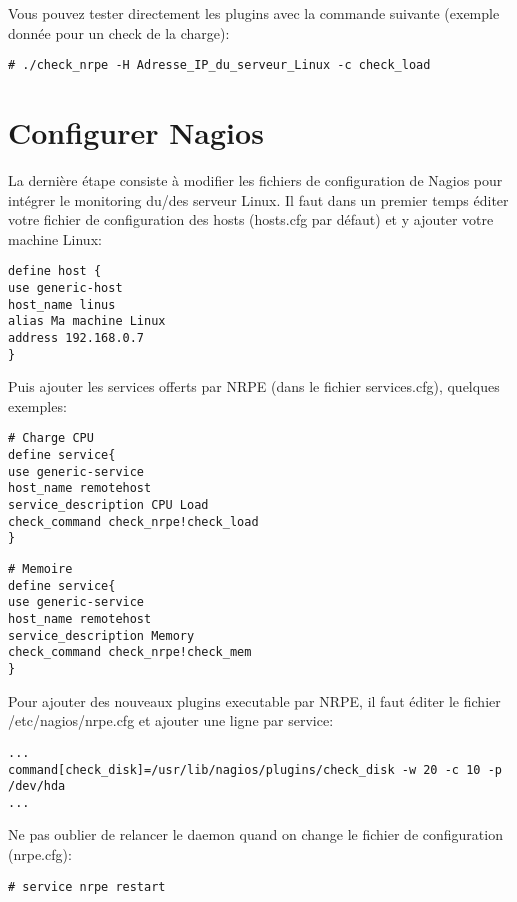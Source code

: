 Vous pouvez tester directement les plugins avec la commande suivante (exemple donnée pour un check de la charge):
\begin{verbatim}
# ./check_nrpe -H Adresse_IP_du_serveur_Linux -c check_load
\end{verbatim}

\section {Configurer Nagios}
La dernière étape consiste à modifier les fichiers de configuration de Nagios pour intégrer le monitoring du/des serveur Linux. Il faut dans un premier temps éditer votre fichier de configuration des hosts (hosts.cfg par défaut) et y ajouter votre machine Linux:
\begin{verbatim}
define host {
use generic-host
host_name linus
alias Ma machine Linux
address 192.168.0.7
}
\end{verbatim}

Puis ajouter les services offerts par NRPE (dans le fichier services.cfg), quelques exemples:
\begin{verbatim}
# Charge CPU
define service{
use generic-service
host_name remotehost
service_description CPU Load
check_command check_nrpe!check_load
}
\end{verbatim}
\begin{verbatim}
# Memoire
define service{
use generic-service
host_name remotehost
service_description Memory
check_command check_nrpe!check_mem
}
\end{verbatim}

Pour ajouter des nouveaux plugins executable par NRPE, il faut éditer le fichier /etc/nagios/nrpe.cfg et ajouter une ligne par service:
\begin{verbatim}
...
command[check_disk]=/usr/lib/nagios/plugins/check_disk -w 20 -c 10 -p /dev/hda
...
\end{verbatim}

Ne pas oublier de relancer le daemon quand on change le fichier de configuration (nrpe.cfg):
\begin{verbatim}
# service nrpe restart
\end{verbatim}



